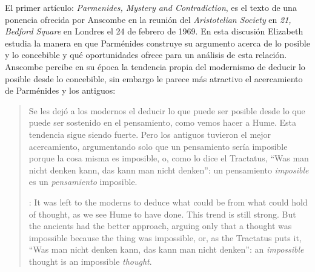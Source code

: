 El primer artículo: \emph{Parmenides, Mystery and Contradiction}, es el texto de
una ponencia ofrecida por Anscombe en la reunión del \emph{Aristotelian Society}
en \emph{21, Bedford Square} en Londres el 24 de febrero de 1969. En esta
discusión Elizabeth estudia la manera en que Parménides construye su argumento
acerca de lo posible y lo concebible y qué oportunidades ofrece para un análisis
de esta relación. Anscombe percibe en su época la tendencia propia del
modernismo de deducir lo posible desde lo concebible, sin embargo le parece más
atractivo el acercamiento de Parménides y los antiguos:
\blockquote[{\cite[xi]{anscombe1981parmenides}}: It was left to the moderns to
deduce what could be from what could hold of thought, as we see Hume to have
done. This trend is still strong. But the ancients had the better approach,
arguing only that a thought was impossible because the thing was impossible, or,
as the Tractatus puts it, ``Was man nicht denken kann, das kann man nicht
denken'': an \emph{impossible} thought is an impossible \emph{thought}.]{Se les
  dejó a los modernos el deducir lo que puede ser posible desde lo que puede ser
  sostenido en el pensamiento, como vemos hacer a Hume. Esta tendencia sigue
  siendo fuerte. Pero los antiguos tuvieron el mejor acercamiento, argumentando
  solo que un pensamiento sería imposible porque la cosa misma es imposible, o,
  como lo dice el Tractatus, ``Was man nicht denken kann, das kann man nicht
  denken'': un pensamiento \emph{imposible} es un \emph{pensamiento} imposible.}

